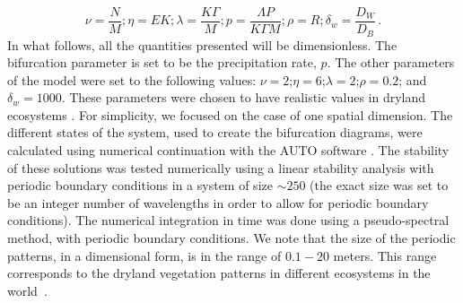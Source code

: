 \documentclass[aps,prl,preprint,superscriptaddress,floatfix]{revtex4-1}
\begin{document}
\begin{equation}
   \nu = \frac{N}{M};   \eta = E K;  \lambda = \frac{K \Gamma}{M};  p = \frac{\Lambda P}{K \Gamma M} ;   \rho = R ;   \delta_w = \frac{D_W}{D_B} \,.
\end{equation}
In what follows, all the quantities presented will be dimensionless. The bifurcation parameter is set to be the precipitation rate, $p$. 
The other parameters of the model were set to the following values: $\nu=2$;$\eta=6$;$\lambda=2$;$\rho=0.2$; and $\delta_w=1000$.
These parameters were chosen to have realistic values in dryland ecosystems \cite{Zelnik2015}.
For simplicity, we focused on the case of one spatial dimension.
The different states of the system, used to create the bifurcation diagrams, were calculated using numerical continuation with the AUTO software \cite{doedel1981auto}.
The stability of these solutions was tested numerically using a linear stability analysis with periodic boundary conditions in a system of size $\sim 250$ 
(the exact size was set to be an integer number of wavelengths in order to allow for periodic boundary conditions).
The numerical integration in time was done using a pseudo-spectral method, with periodic boundary conditions.
We note that the size of the periodic patterns, in a dimensional form, is in the range of $0.1-20$ meters. This range corresponds to the dryland vegetation patterns in different ecosystems in the world~\cite{Deblauwe2008geb}.
\end{document}
